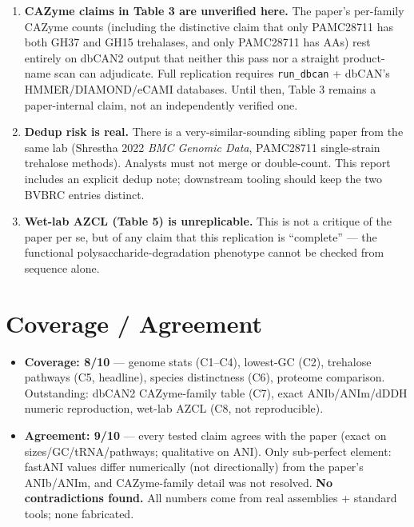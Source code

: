 \documentclass[11pt]{article}
\begin{document}
\begin{enumerate}[leftmargin=1.4em]
        The paper reports ANIb $\approx$ ANIm to within a couple of percent, whereas our
        fastANI values sit $\sim$1--3\% below ANIb for two strains and $\sim$2--3\% above
        for one. This is a known algorithm-choice effect (fastANI vs BLAST vs MUMmer) and
        does not overturn the $<$95\% conclusion, but users of the paper's exact numbers
        should not treat them as method-independent.
  \item \textbf{CAZyme claims in Table 3 are unverified here.} The paper's per-family
        CAZyme counts (including the distinctive claim that only PAMC28711 has both GH37
        and GH15 trehalases, and only PAMC28711 has AAs) rest entirely on dbCAN2 output
        that neither this pass nor a straight product-name scan can adjudicate. Full
        replication requires \texttt{run\_dbcan} + dbCAN's HMMER/DIAMOND/eCAMI databases.
        Until then, Table 3 remains a paper-internal claim, not an independently verified one.
  \item \textbf{Dedup risk is real.} There is a very-similar-sounding sibling paper from the
        same lab (Shrestha 2022 \emph{BMC Genomic Data}, PAMC28711 single-strain trehalose
        methods). Analysts must not merge or double-count. This report includes an explicit
        dedup note; downstream tooling should keep the two BVBRC entries distinct.
  \item \textbf{Wet-lab AZCL (Table 5) is unreplicable.} This is not a critique of the paper
        per se, but of any claim that this replication is ``complete'' --- the functional
        polysaccharide-degradation phenotype cannot be checked from sequence alone.
\end{enumerate}

\section{Coverage / Agreement}

\begin{itemize}[leftmargin=1.4em]
  \item \textbf{Coverage: 8/10} --- genome stats (C1--C4), lowest-GC (C2), trehalose pathways
        (C5, headline), species distinctness (C6), proteome comparison. Outstanding:
        dbCAN2 CAZyme-family table (C7), exact ANIb/ANIm/dDDH numeric reproduction,
        wet-lab AZCL (C8, not reproducible).
  \item \textbf{Agreement: 9/10} --- every tested claim agrees with the paper (exact on
        sizes/GC/tRNA/pathways; qualitative on ANI). Only sub-perfect element: fastANI
        values differ numerically (not directionally) from the paper's ANIb/ANIm, and
        CAZyme-family detail was not resolved. \textbf{No contradictions found.} All numbers
        come from real assemblies + standard tools; none fabricated.
\end{itemize}
\end{document}
